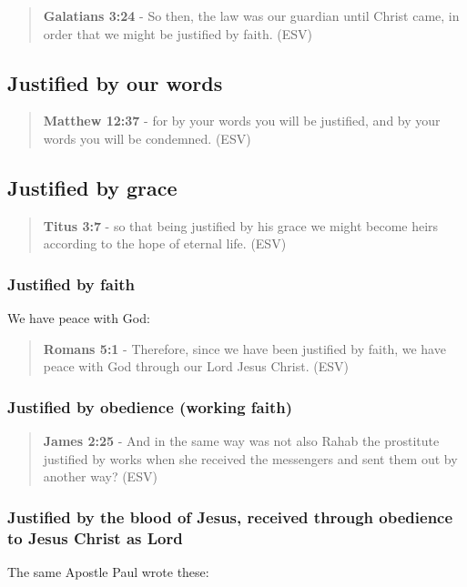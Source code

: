 \documentclass[11pt]{article}
\begin{document}
\begin{quote}
\textbf{Galatians 3:24} - So then, the law was our guardian until Christ came, in order that we might be justified by faith. (ESV)
\end{quote}

\subsection{Justified by our words}
\label{sec:org2c81a34}
\begin{quote}
\textbf{Matthew 12:37} - for by your words you will be justified, and by your words you will be condemned. (ESV)
\end{quote}

\subsection{Justified by grace}
\label{sec:org42d80a7}
\begin{quote}
\textbf{Titus 3:7} - so that being justified by his grace we might become heirs according to the hope of eternal life. (ESV)
\end{quote}

\subsubsection{Justified by faith}
\label{sec:org34e5eda}

We have peace with God:

\begin{quote}
\textbf{Romans 5:1} - Therefore, since we have been justified by faith, we have peace with God through our Lord Jesus Christ. (ESV)
\end{quote}

\subsubsection{Justified by obedience (working faith)}
\label{sec:orgfc89577}

\begin{quote}
\textbf{James 2:25} - And in the same way was not also Rahab the prostitute justified by works when she received the messengers and sent them out by another way? (ESV)
\end{quote}

\subsubsection{Justified by the blood of Jesus, received through obedience to Jesus Christ as Lord}
\label{sec:org1f256db}
The same Apostle Paul wrote these:
\end{document}
